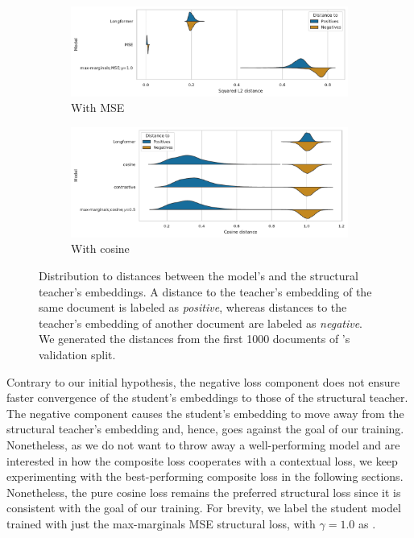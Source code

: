 \begin{figure}
  \centering
  \begin{subfigure}{\textwidth}
    \includegraphics[width=\textwidth]{img/composite_mse_distances.pdf}
    \caption{With MSE}

    \label{fig:composite_mse_distances}

  \end{subfigure}
  \begin{subfigure}{\textwidth}

    \includegraphics[width=\textwidth]{img/composite_cos_distances.pdf}
    \caption{With cosine}

    \label{fig:composite_cos_distances}
  \end{subfigure}

  \caption{Distribution to distances between the model's and the structural
  teacher's embeddings. A distance to the teacher's embedding of the same document
  is labeled as \emph{positive}, whereas distances to the teacher's embedding of
  another document are labeled as \emph{negative}. We generated the distances from the first 1000 documents of 's validation split.}

  \label{fig:composite_distances}

\end{figure}

Contrary to our initial hypothesis, the negative loss component
does not ensure faster convergence of the student's embeddings to those of the
structural teacher. The negative component causes the student's
embedding to move away from the structural teacher's embedding and, hence, goes
against the goal of our training. Nonetheless, as we do not want to throw away
a well-performing model and are interested in how the composite loss cooperates with a contextual loss, we keep experimenting with the best-performing
composite loss in the following sections. Nonetheless, the pure cosine loss remains
the preferred structural loss since it is consistent with the goal of our
training. For brevity, we label the student model trained with just the
max-marginals MSE structural loss, with $\gamma=1.0$ as
.

